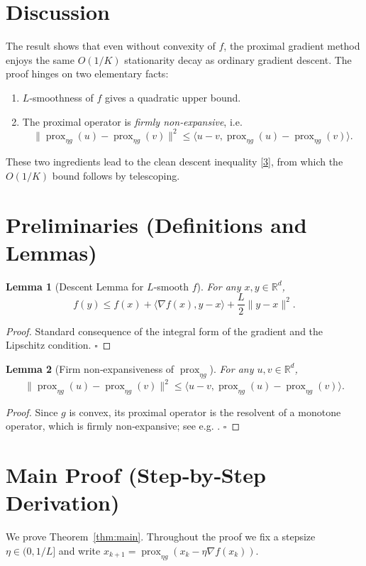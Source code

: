 \documentclass{article}
\newtheorem{lemma}{Lemma}
\begin{document}
\section*{Discussion}
The result shows that even without convexity of $f$, the proximal gradient method enjoys the same $O(1/K)$ stationarity decay as ordinary gradient descent. The proof hinges on two elementary facts:
\begin{enumerate}[noitemsep]
    \item $L$‑smoothness of $f$ gives a quadratic upper bound.
    \item The proximal operator is \emph{firmly non‑expansive}, i.e. 
          \[
          \|\operatorname{prox}_{\eta g}(u)-\operatorname{prox}_{\eta g}(v)\|^{2}
          \le \langle u-v,\operatorname{prox}_{\eta g}(u)-\operatorname{prox}_{\eta g}(v)\rangle .
          \tag{4}
          \]
\end{enumerate}
These two ingredients lead to the clean descent inequality \eqref{3}, from which the $O(1/K)$ bound follows by telescoping.

\newpage

\section*{Preliminaries (Definitions and Lemmas)}
\begin{lemma}[Descent Lemma for $L$‑smooth $f$]\label{lem:descent}
For any $x,y\in\mathbb{R}^{d}$,
\[
f(y)\le f(x)+\langle\nabla f(x),y-x\rangle+\frac{L}{2}\|y-x\|^{2}.
\tag{5}
\]
\end{lemma}
\begin{proof}
Standard consequence of the integral form of the gradient and the Lipschitz condition. \hfill $\square$
\end{proof}

\begin{lemma}[Firm non‑expansiveness of $\operatorname{prox}_{\eta g}$]\label{lem:firm}
For any $u,v\in\mathbb{R}^{d}$,
\[
\|\operatorname{prox}_{\eta g}(u)-\operatorname{prox}_{\eta g}(v)\|^{2}
\le\langle u-v,\operatorname{prox}_{\eta g}(u)-\operatorname{prox}_{\eta g}(v)\rangle .
\tag{6}
\]
\end{lemma}
\begin{proof}
Since $g$ is convex, its proximal operator is the resolvent of a monotone operator, which is firmly non‑expansive; see e.g. \cite{Parikh2014}. \hfill $\square$
\end{proof}

\section*{Main Proof (Step‑by‑Step Derivation)}
We prove Theorem~\ref{thm:main}. Throughout the proof we fix a stepsize $\eta\in(0,1/L]$ and write $x_{k+1}= \operatorname{prox}_{\eta g}(x_k-\eta\nabla f(x_k))$.
\end{document}
